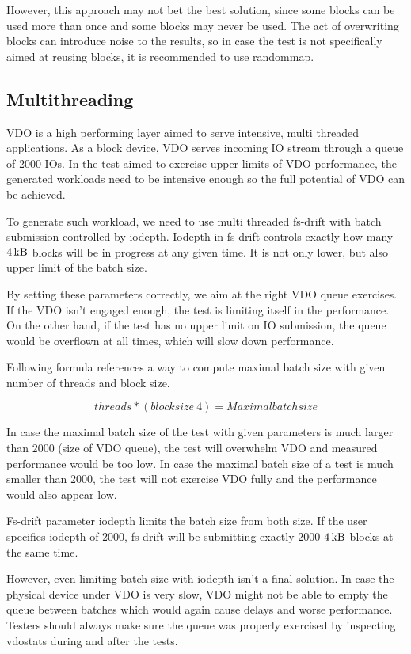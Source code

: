 \documentclass[
  color, %
  table, %
  lof,   %
  lot,   %
]{fithesis3}
\begin{document}
However, this approach may not bet the best solution, since some blocks can be used more than once and some blocks may never be used. The act of overwriting blocks can introduce noise to the results, so in case the test is not specifically aimed at reusing blocks, it is recommended to use randommap.

\subsection{Multithreading}
VDO is a high performing layer aimed to serve intensive, multi threaded applications. As a block device, VDO serves incoming IO stream through a queue of 2000 IOs. In the test aimed to exercise upper limits of VDO performance, the generated workloads need to be intensive enough so the full potential of VDO can be achieved.

To generate such workload, we need to use multi threaded fs-drift with batch submission controlled by iodepth. Iodepth in fs-drift controls exactly how many $\SI{4}{\kilo\byte}$ blocks will be in progress at any given time. It is not only lower, but also upper limit of the batch size.

By setting these parameters correctly, we aim at the right VDO queue exercises. If the VDO isn't engaged enough, the test is limiting itself in the performance. On the other hand, if the test has no upper limit on IO submission, the queue would be overflown at all times, which will slow down performance.

Following formula references a way to compute maximal batch size with given number of threads and block size.

\[ threads * (blocksize \ 4) = Maximal batch size \]

In case the maximal batch size of the test with given parameters is much larger than 2000 (size of VDO queue), the test will overwhelm VDO and measured performance would be too low. In case the maximal batch size of a test is much smaller than 2000, the test will not exercise VDO fully and the performance would also appear low.

Fs-drift parameter iodepth limits the batch size from both size. If the user specifies iodepth of 2000, fs-drift will be submitting exactly 2000 $\SI{4}{\kilo\byte}$ blocks at the same time.

However, even limiting batch size with iodepth isn't a final solution. In case the physical device under VDO is very slow, VDO might not be able to empty the queue between batches which would again cause delays and worse performance. Testers should always make sure the queue was properly exercised by inspecting vdostats during and after the tests.
\end{document}
